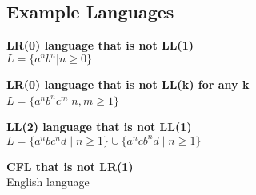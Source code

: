 
\begin{samepage}
\section{Example Languages}
\textbf{LR(0) language that is not LL(1)}\\
    $L = \{a^n b^n | n \geq 0\}$

\textbf{LR(0) language that is not LL(k) for any k}\\
$L = \{a^n b^n c^m | n, m \geq 1\} $\

\textbf{LL(2) language that is not LL(1)}\\
$L = \{ a^n b c^n d \mid n \geq 1 \} \cup \{ a^n c b^n d \mid n \geq 1 \}$

\textbf{CFL that is not LR(1)}\\
    English language
\end{samepage}
